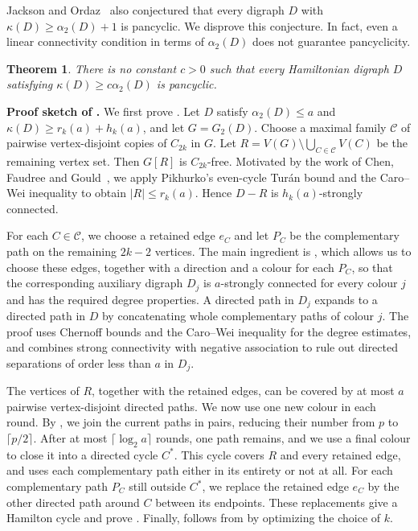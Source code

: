 \documentclass[11pt,a4paper]{article}
\newtheorem{theorem}{Theorem}[section]
\theoremstyle{remark}
\numberwithin{equation}{section}
\newcommand{\calC}{\mathcal{C}}
\newcommand{\al}{\alpha_2}
\begin{document}
	Jackson and Ordaz~\cite{JO} also conjectured
	that every digraph $D$ with $\kappa(D)\ge\al(D)+1$ is pancyclic.
	We disprove this conjecture. In fact, even a linear connectivity
	condition in terms of $\al(D)$ does not guarantee pancyclicity.
	
	\begin{theorem}\label{thm:pancyclic-obstruction}
		There is no constant $c>0$ such that every Hamiltonian digraph $D$ satisfying
		$\kappa(D)\ge c\al(D)$ is pancyclic.
	\end{theorem}
\medskip\noindent\textbf{Proof sketch of .}
We first prove .
Let $D$ satisfy $\alpha_2(D)\le a$ and
$\kappa(D)\ge r_k(a)+h_k(a)$, and let $G=G_2(D)$.
Choose a maximal family $\calC$ of pairwise vertex-disjoint
copies of $C_{2k}$ in $G$.
Let $R=V(G)\setminus\bigcup_{C\in\calC}V(C)$ be the remaining vertex set.
Then $G[R]$ is $C_{2k}$-free.
Motivated by the work of Chen, Faudree and Gould~\cite{CFG}, we apply Pikhurko's even-cycle Tur\'an bound and the Caro--Wei inequality to obtain $|R|\le r_k(a)$.
Hence $D-R$ is $h_k(a)$-strongly connected.

For each $C\in\calC$, we choose a retained edge $e_C$ and let $P_C$ be the complementary path on the remaining $2k-2$ vertices.
The main ingredient is , which allows us to choose these edges, together with a direction and a colour for each $P_C$, so that the corresponding auxiliary digraph $D_j$ is $a$-strongly connected for every colour $j$ and has the required degree properties.
A directed path in $D_j$ expands to a directed path in $D$ by concatenating whole complementary paths of colour $j$.
The proof uses Chernoff bounds and the Caro--Wei inequality for the degree estimates, and combines strong connectivity with negative association to rule out directed separations of order less than $a$ in $D_j$.

The vertices of $R$, together with the retained edges, can be covered by at most $a$ pairwise vertex-disjoint directed paths.
We now use one new colour in each round.
By , we join the current paths in pairs, reducing their number from $p$ to $\lceil p/2\rceil$.
After at most $\lceil\log_2 a\rceil$ rounds, one path remains, and we use a final colour to close it into a directed cycle $C^*$.
This cycle covers $R$ and every retained edge, and uses each complementary path either in its entirety or not at all.
For each complementary path $P_C$ still outside $C^*$, we replace the retained edge $e_C$ by the other directed path around $C$ between its endpoints.
These replacements give a Hamilton cycle and prove .
Finally,  follows from  by optimizing the choice of $k$.
\end{document}
